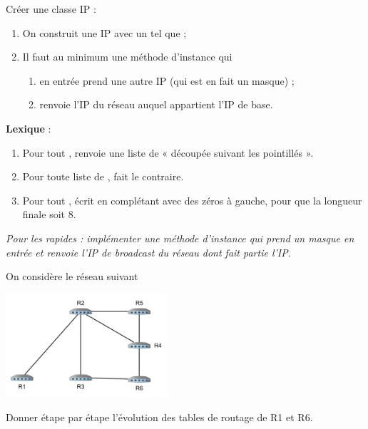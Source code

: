 \documentclass[a4paper,12pt,french]{article}
\begin{document}
\begin{exercice}
Créer une classe IP :
\begin{enumerate}[--]
	\item 	On construit une IP avec un  tel que  ;
	\item 	Il faut au minimum une méthode d'instance  qui 
	\begin{enumerate}[\textbullet]
		\item 	en entrée prend une autre IP (qui est en fait un masque) ;
		\item 	renvoie l'IP du réseau auquel appartient l'IP de base.
	\end{enumerate}
\end{enumerate}
\textbf{Lexique} : 
\begin{enumerate}[--]
	\item 	Pour tout ,  renvoie une liste de  « découpée suivant les pointillés ».
	\item 	Pour toute liste de ,  fait le contraire.
	\item 	Pour tout ,  écrit  en complétant avec des zéros à gauche, pour que la longueur finale soit 8.
\end{enumerate}
\textit{Pour les rapides : implémenter une méthode d'instance  qui prend un masque en entrée et renvoie l'IP de broadcast du réseau dont fait partie l'IP.}
\end{exercice}
\newpage
\begin{exercice}
On considère le réseau suivant
\begin{center}
	\includegraphics[width=6cm]{img/res1.png}
\end{center}

Donner étape par étape l'évolution des tables de routage de R1 et R6.
\end{exercice}
\end{document}
